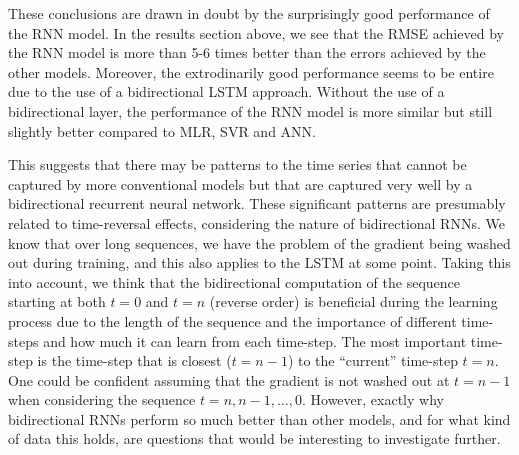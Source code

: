 \documentclass[11pt]{article}
\begin{document}
These conclusions are drawn in doubt by the surprisingly good performance of the RNN model.
In the results section above, we see that the RMSE achieved by the RNN model is more than 5-6 times better than the errors achieved by the other models.
Moreover, the extrodinarily good performance seems to be entire due to the use of a bidirectional LSTM approach.
Without the use of a bidirectional layer, the performance of the RNN model is more similar but still slightly better compared to MLR, SVR and ANN.

This suggests that there may be patterns to the time series that cannot be captured by more conventional models but that are captured very well by a bidirectional recurrent neural network.
These significant patterns are presumably related to time-reversal effects, considering the nature of bidirectional RNNs. We know that over long sequences, we have the problem of the gradient being washed out during training, and this also applies to the LSTM at some point. Taking this into account, we think that the bidirectional computation of the sequence starting at both $t = 0$ and $t = n$ (reverse order) is beneficial during the learning process due to the length of the sequence and the importance of different time-steps and how much it can learn from each time-step. The most important time-step is the time-step that is closest ($t = n-1$) to the ``current'' time-step $t = n$. One could be confident assuming that the gradient is not washed out at $t = n-1$ when considering the sequence $t = n, n-1, \dots, 0$. However, exactly why bidirectional RNNs perform so much better than other models, and for what kind of data this holds, are questions that would be interesting to investigate further.



\printbibliography
\end{document}
